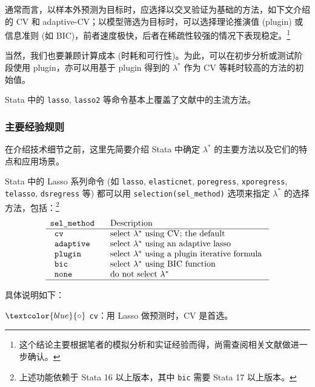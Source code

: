 通常而言，以样本外预测为目标时，应选择以交叉验证为基础的方法，如下文介绍的 CV 和 adaptive-CV；以模型筛选为目标时，可以选择理论推演值 (plugin) 或信息准则 (如 BIC)，前者速度极快，后者在稀疏性较强的情况下表现稳定。\footnote{%
       这个结论主要根据笔者的模拟分析和实证经验而得，尚需查阅相关文献做进一步确认。}

当然，我们也要兼顾计算成本 (时耗和可行性)。为此，可以在初步分析或测试阶段使用 plugin，亦可以用基于 plugin 得到的 $\lambda^*$ 作为 CV 等耗时较高的方法的初始值。%

Stata 中的 \texttt{lasso}, \texttt{lasso2} 等命令基本上覆盖了文献中的主流方法。
\subsubsection{主要经验规则}


在介绍技术细节之前，这里先简要介绍 Stata 中确定 $\lambda^*$ 的主要方法以及它们的特点和应用场景。

Stata 中的 Lasso 系列命令 (如 \texttt{lasso}, \texttt{elasticnet}, \texttt{poregress}, \texttt{xporegress}, \texttt{telasso}, \texttt{dsregress} 等) 都可以用 \texttt{selection(sel\_method)} 选项来指定 $\lambda^*$ 的选择方法，包括：\footnote{上述功能依赖于 Stata 16 以上版本，其中 \texttt{bic} 需要 Stata 17 以上版本。}
$$
\vspace{-3pt}
\begin{array}{ll}
\texttt{sel\_method } & \text { Description } \\
\hline \texttt{ cv} & \text { select $\lambda^*$ using CV; the default } \\
\texttt { adaptive } & \text { select $\lambda^*$ using an adaptive lasso } \\
\texttt { plugin} & \text { select $\lambda^*$ using a plugin iterative formula } \\
\texttt { bic} & \text { select $\lambda^*$ using BIC function } \\
\texttt { none } & \text { do not select $\lambda^*$ } \\
\hline 
\end{array}
$$

\vspace{10pt}
具体说明如下：

$\textcolor{blue}{\circ}$ \texttt{cv}：用 Lasso 做预测时，CV 是首选。

